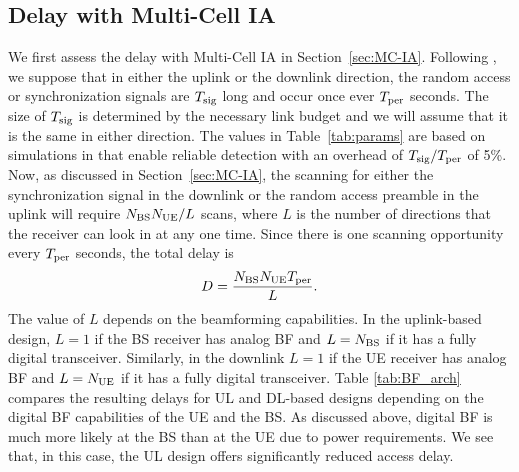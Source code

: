 \documentclass[conference,a4paper]{IEEEtran}
\begin{document}
\subsection{Delay with Multi-Cell IA}
\label{sec:delay}

We first assess the delay with Multi-Cell IA in Section~\ref{sec:MC-IA}.
Following \cite{Barati,barati2015initial},
we suppose that in either the uplink or the downlink
direction, the random access or synchronization signals are $T_{\rm sig}$ long
and occur once ever $T_{\rm per}$ seconds.  The size of $T_{\rm sig}$ is
determined by the necessary link budget and we will assume that it is the same in either
direction.  The values in Table~\ref{tab:params} are based on simulations in 
\cite{barati2015initial} that enable reliable detection with an overhead of $T_{\rm sig}/T_{\rm per}$
of 5\%.  Now, as discussed in Section~\ref{sec:MC-IA}, the scanning for either the synchronization 
signal in the downlink or the random access preamble in the uplink will require
$N_{\rm BS}N_{\rm UE}/L$ scans, where $L$ is the number of directions that the 
receiver can look in at any one time.  Since there is one scanning opportunity every $T_{\rm per}$
seconds, the total delay is
\[
    D = \frac{N_{\rm BS}N_{\rm UE}T_{\rm per}}{L}.
\]
The value of $L$ depends on the beamforming capabilities.  In the uplink-based design, $L=1$ if
the BS receiver has analog BF and $L=N_{\rm BS}$ if it has a fully digital transceiver.
Similarly, in the downlink
$L=1$ if the UE receiver has analog BF and $L=N_{\rm UE}$ if it has a fully digital transceiver.
Table \ref{tab:BF_arch} compares the resulting delays for UL and DL-based designs
depending on the digital BF capabilities of the UE and the BS.  As discussed above,
digital BF is much more likely at the BS than at the UE due to power requirements.
We see that, in this case, the UL design offers significantly reduced access delay.
\end{document}
